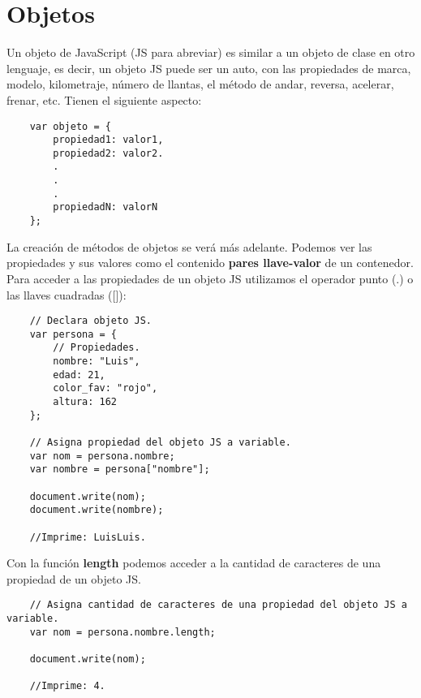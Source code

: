 \section{Objetos}
\hspace{0.55cm}Un objeto de JavaScript (JS para abreviar) es similar a un objeto de clase en otro lenguaje, es decir, un objeto JS puede ser un auto, con las propiedades de marca, modelo, kilometraje, número de llantas, el método de andar, reversa, acelerar, frenar, etc. Tienen el siguiente aspecto:
\begin{lstlisting}
    var objeto = {
        propiedad1: valor1,
        propiedad2: valor2.
        .
        .
        .
        propiedadN: valorN
    };
\end{lstlisting}

La creación de métodos de objetos se verá más adelante. Podemos ver las propiedades y sus valores como el contenido \textbf{pares llave-valor} de un contenedor.\\
Para acceder a las propiedades de un objeto JS utilizamos el operador punto (.) o las llaves cuadradas ([]):
\begin{lstlisting}
    // Declara objeto JS.
    var persona = {
        // Propiedades.
        nombre: "Luis",
        edad: 21,
        color_fav: "rojo",
        altura: 162
    };

    // Asigna propiedad del objeto JS a variable.
    var nom = persona.nombre;
    var nombre = persona["nombre"];

    document.write(nom);
    document.write(nombre);

    //Imprime: LuisLuis.
\end{lstlisting}

Con la función \textbf{length} podemos acceder a la cantidad de caracteres de una propiedad de un objeto JS.
\begin{lstlisting}
    // Asigna cantidad de caracteres de una propiedad del objeto JS a variable.
    var nom = persona.nombre.length;

    document.write(nom);

    //Imprime: 4.
\end{lstlisting}



